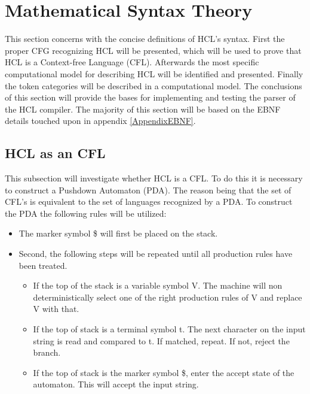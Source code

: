 \section{Mathematical Syntax Theory}
This section concerns with the concise definitions of HCL's syntax.
First the proper CFG recognizing HCL will be presented, which will be used to prove that HCL is a Context-free Language (CFL). 
Afterwards the most specific computational model for describing HCL will be identified and presented. 
Finally the token categories will be described in a computational model. 
The conclusions of this section will provide the bases for implementing and testing the parser of the HCL compiler. 
The majority of this section will be based on the EBNF details touched upon in appendix \ref{AppendixEBNF}.

\subsection{HCL as an CFL}
This subsection will investigate whether HCL is a CFL. 
To do this it is necessary to construct a Pushdown Automaton (PDA).
The reason being that the set of CFL's is equivalent to the set of languages recognized by a PDA.
To construct the PDA the following rules will be utilized:
\begin{center}
	\begin{itemize}
		\item The marker symbol \$ will first be placed on the stack.
		\item Second, the following steps will be repeated until all production rules have been treated.
		\begin{itemize}
			\item If the top of the stack is a variable symbol V. 
			The machine will non deterministically select one of the right production rules of V and replace V with that.   
			\item If the top of stack is a terminal symbol t. 
			The next character on the input string is read and compared to t. 
			If matched, repeat. 
			If not, reject the branch.
			\item If the top of stack is the marker symbol \$, enter the accept state of the automaton. 
			This will accept the input string.
		\end{itemize}
	\end{itemize}
\end{center}

